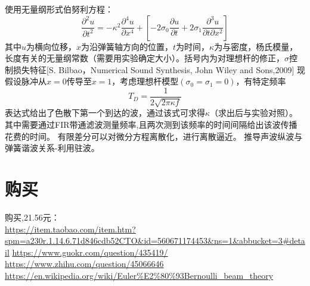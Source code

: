 \documentclass[UTF8,9pt]{ctexart}
\begin{document}
使用无量纲形式伯努利方程：
$$\frac { \partial ^ { 2 } u } { \partial t ^ { 2 } } = - \kappa ^ { 2 } \frac { \partial ^ { 4 } u } { \partial x^{4}} + \left[-2\sigma _0\frac { \partial u } { \partial t } + 2 \sigma _ { 1 } \frac { \partial ^ { 3 } u } { \partial t \partial x ^ { 2 } } \right]$$
其中$u$为横向位移，$x$为沿弹簧轴方向的位置，$t$为时间，$\kappa$为与密度，杨氏模量，长度有关的无量纲常数（需要用实验确定大小）。括号内为对理想杆的修正，$\sigma$控制损失特征[S. Bilbao，Numerical Sound Synthesis, John Wiley and Sons,2009]
现假设脉冲从$x=0$传导至$x=1$，考虑理想杆模型$(\sigma_0=\sigma_1=0)$，有特定频率
$$T _ { D } = \frac { 1 } { 2 \sqrt { 2 \pi \kappa f } }$$
表达式给出了色散下第一个到达的波，通过该式可求得$\kappa$（求出后与实验对照）。\\
其中需要通过FIR带通滤波测量频率,且两次测到该频率的时间间隔给出该波传播花费的时间。
有限差分可以对微分方程离散化，进行离散逼近。
推导声波纵波与弹簧谐波关系-利用驻波。
\section{购买}
购买,21.56元：\\
\url{https://item.taobao.com/item.htm?spm=a230r.1.14.6.71d846cdb52CTO&id=560671174453&ns=1&abbucket=3#detail}
\url{https://www.guokr.com/question/435419/}\\
\url{https://www.zhihu.com/question/45066646}\\
\url{https://en.wikipedia.org/wiki/Euler%E2%80%93Bernoulli_beam_theory}
\end{document}
